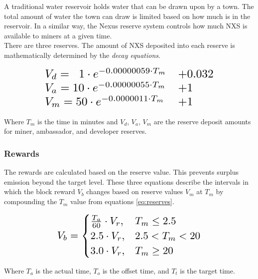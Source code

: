 \documentclass[11pt]{article}
\begin{document}
A traditional water reservoir holds water that can be drawn upon by a town.
The total amount of water the town can draw is limited based on how much is in the reservoir.
In a similar way, the Nexus reserve system controls how much NXS is available to miners at a given time.\\ 

\noindent There are three reserves.
The amount of NXS deposited into each reserve is 
mathematically determined by the \textit{decay equations}.

\begin{equation}\label{eq:reserves}
\resizebox{.75\hsize}{!}{$
\begin{array}{ll}
      V_{d} = \;\;1 \cdot e^{-0.00000059 \cdot T_{m}} & + 0.032 \\
      V_{a} = 10 \cdot e^{-0.00000055 \cdot T_{m}} & + 1 \\
      V_{m} = 50 \cdot e^{-0.0000011 \cdot T_{m}} & + 1 \\
\end{array} $}
\end{equation}

\noindent Where $T_m$ is the time in minutes and $V_{d}$, $V_{a}$, $V_{m}$ are the reserve deposit amounts for miner, ambassador, and developer reserves.

\pagebreak
\subsubsection{Rewards}

The rewards are calculated based on the reserve value.
This prevents surplus emission beyond the target level.
\noindent These three equations describe the intervals in which the block reward $V_{b}$ changes
based on reserve values $V_{m}$ at $T_{m}$ by compounding the $T_{m}$ value from equations \ref{eq:reserves}.

\begin{equation}
\resizebox{.60\hsize}{!}{$
    V_b= 
\begin{cases}
    \frac{T_{a}}{60} \cdot V_{r}, & T_{m} \leq 2.5\\
    2.5 \cdot V_{r}, & 2.5 < T_{m} < 20\\
    3.0 \cdot V_{r}, & T_{m} \geq 20
\end{cases}
$}
\end{equation}

\begin{center}
Where $T_a$ is the actual time, $T_o$ is the offset time, and $T_t$ is the target time.\\
\end{center}
\end{document}

